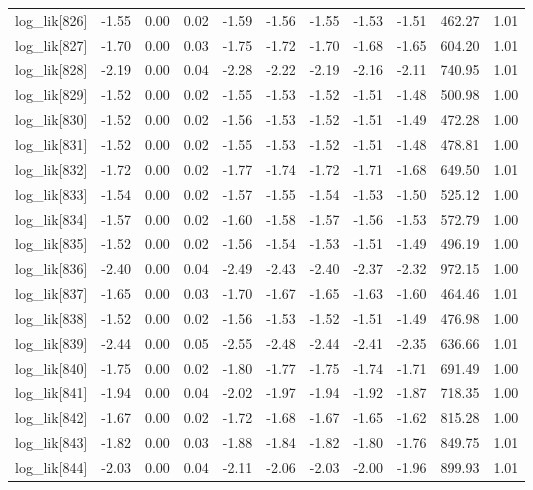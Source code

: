 \begin{table}[ht]
\begin{tabular}{rrrrrrrrrrr}
  log\_lik[826] & -1.55 & 0.00 & 0.02 & -1.59 & -1.56 & -1.55 & -1.53 & -1.51 & 462.27 & 1.01 \\ 
  log\_lik[827] & -1.70 & 0.00 & 0.03 & -1.75 & -1.72 & -1.70 & -1.68 & -1.65 & 604.20 & 1.01 \\ 
  log\_lik[828] & -2.19 & 0.00 & 0.04 & -2.28 & -2.22 & -2.19 & -2.16 & -2.11 & 740.95 & 1.01 \\ 
  log\_lik[829] & -1.52 & 0.00 & 0.02 & -1.55 & -1.53 & -1.52 & -1.51 & -1.48 & 500.98 & 1.00 \\ 
  log\_lik[830] & -1.52 & 0.00 & 0.02 & -1.56 & -1.53 & -1.52 & -1.51 & -1.49 & 472.28 & 1.00 \\ 
  log\_lik[831] & -1.52 & 0.00 & 0.02 & -1.55 & -1.53 & -1.52 & -1.51 & -1.48 & 478.81 & 1.00 \\ 
  log\_lik[832] & -1.72 & 0.00 & 0.02 & -1.77 & -1.74 & -1.72 & -1.71 & -1.68 & 649.50 & 1.01 \\ 
  log\_lik[833] & -1.54 & 0.00 & 0.02 & -1.57 & -1.55 & -1.54 & -1.53 & -1.50 & 525.12 & 1.00 \\ 
  log\_lik[834] & -1.57 & 0.00 & 0.02 & -1.60 & -1.58 & -1.57 & -1.56 & -1.53 & 572.79 & 1.00 \\ 
  log\_lik[835] & -1.52 & 0.00 & 0.02 & -1.56 & -1.54 & -1.53 & -1.51 & -1.49 & 496.19 & 1.00 \\ 
  log\_lik[836] & -2.40 & 0.00 & 0.04 & -2.49 & -2.43 & -2.40 & -2.37 & -2.32 & 972.15 & 1.00 \\ 
  log\_lik[837] & -1.65 & 0.00 & 0.03 & -1.70 & -1.67 & -1.65 & -1.63 & -1.60 & 464.46 & 1.01 \\ 
  log\_lik[838] & -1.52 & 0.00 & 0.02 & -1.56 & -1.53 & -1.52 & -1.51 & -1.49 & 476.98 & 1.00 \\ 
  log\_lik[839] & -2.44 & 0.00 & 0.05 & -2.55 & -2.48 & -2.44 & -2.41 & -2.35 & 636.66 & 1.01 \\ 
  log\_lik[840] & -1.75 & 0.00 & 0.02 & -1.80 & -1.77 & -1.75 & -1.74 & -1.71 & 691.49 & 1.00 \\ 
  log\_lik[841] & -1.94 & 0.00 & 0.04 & -2.02 & -1.97 & -1.94 & -1.92 & -1.87 & 718.35 & 1.00 \\ 
  log\_lik[842] & -1.67 & 0.00 & 0.02 & -1.72 & -1.68 & -1.67 & -1.65 & -1.62 & 815.28 & 1.00 \\ 
  log\_lik[843] & -1.82 & 0.00 & 0.03 & -1.88 & -1.84 & -1.82 & -1.80 & -1.76 & 849.75 & 1.01 \\ 
  log\_lik[844] & -2.03 & 0.00 & 0.04 & -2.11 & -2.06 & -2.03 & -2.00 & -1.96 & 899.93 & 1.01 \\ 

\end{tabular}
\end{table}
